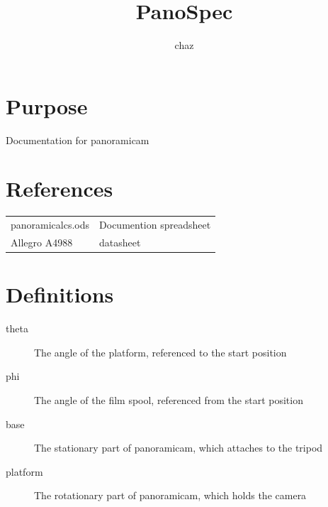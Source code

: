 \documentclass[dvips,12pt]{article}
\title{PanoSpec}
\author{chaz}
\begin{document}
\frenchspacing


\section{Purpose}
Documentation for panoramicam

\tableofcontents
\listoffigures

\renewcommand{\arraystretch}{1}
\section{References}
\begin{adjustwidth}{2.5em}{0pt}
\begin{tabular}{ l  l }
panoramicalcs.ods & Documention spreadsheet \\
Allegro A4988  & datasheet\\
\end{tabular}
\end{adjustwidth}

\section{Definitions}
\begin{adjustwidth}{2.5em}{0pt}
\begin{description}
    \item[theta] The angle of the platform, referenced to the start position
    \item[phi] The angle of the film spool, referenced from the start position
    \item[base] The stationary part of panoramicam, which attaches to the tripod
    \item[platform]The rotationary part of panoramicam, which holds the camera
\end{description}
\end{adjustwidth}
\end{document}
